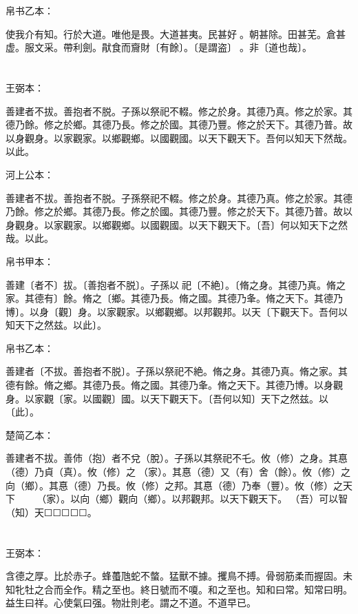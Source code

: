 \documentclass[a5paper]{ctexbook}
\begin{document}
    帛书乙本：

    使我介有知。行於大道。唯他是畏。大道甚夷。民甚好𠎿。朝甚除。田甚芜。倉甚虚。服文采。帶利劍。猒食而齎財〔有餘〕。〔是謂盗〕󱀖。非〔道也哉〕。

    \chapter{}
    王弼本：

    善建者不拔。善抱者不脱。子孫以祭祀不輟。修之於身。其德乃真。修之於家。其德乃餘。修之於鄉。其德乃長。修之於國。其德乃豐。修之於天下。其德乃普。故以身觀身。以家觀家。以鄉觀鄉。以國觀國。以天下觀天下。吾何以知天下然哉。以此。

    河上公本：

    善建者不拔。善抱者不脱。子孫祭祀不輟。修之於身。其德乃真。修之於家。其德乃餘。修之於鄉。其德乃長。修之於國。其德乃豐。修之於天下。其德乃普。故以身觀身。以家觀家。以鄉觀鄉。以國觀國。以天下觀天下。〔吾〕何以知天下之然哉。以此。

    帛书甲本：

    善建〔者不〕拔。〔善抱者不脱〕。子孫以󱁃祀〔不絶〕。〔脩之身。其德乃真。脩之家。其德有〕餘。脩之〔鄉。其德乃長。脩之國。其德乃夆。脩之天下。其德乃博〕。以身〔觀〕身。以家觀家。以鄉觀鄉。以邦觀邦。以天〔下觀天下。吾何以知天下之然兹。以此〕。

    帛书乙本：

    善建者〔不拔。善抱者不脱〕。子孫以祭祀不絶。脩之身。其德乃真。脩之家。其德有餘。脩之鄉。其德乃長。脩之國。其德乃夆。脩之天下。其德乃博。以身觀身。以家觀〔家。以國觀〕國。以天下觀天下。〔吾何以知〕天下之然兹。以〔此〕。

    楚简乙本：

    善建者不拔。善伂（抱）者不兌（脫）。子孫以其祭祀不乇。攸（修）之身。其惪（德）乃貞（真）。攸（修）之𧱌（家）。其惪（德）又（有）舍（餘）。攸（修）之向（鄉）。其惪（德）乃長。攸（修）之邦。其惪（德）乃奉（豐）。攸（修）之天下☐☐☐☐☐☐☐𧱌（家）。以向（鄉）觀向（鄉）。以邦觀邦。以天下觀天下。󼾲（吾）可以智（知）天☐☐☐☐☐。

    \chapter{}
    王弼本：

    含德之厚。比於赤子。蜂蠆虺蛇不螫。猛獸不據。攫鳥不搏。骨弱筋柔而握固。未知牝牡之合而全作。精之至也。終日號而不嗄。和之至也。知和曰常。知常曰明。益生曰祥。心使氣曰强。物壯則老。謂之不道。不道早已。
\end{document}
